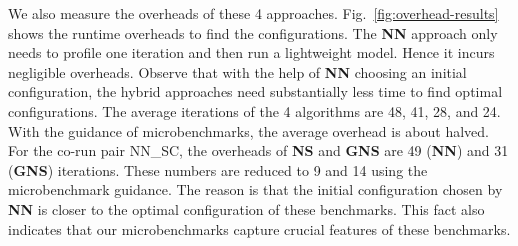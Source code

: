 We also measure the %
overheads of these 4 approaches. 
Fig.~\ref{fig:overhead-results} shows the runtime overheads to find the configurations. 
The \textbf{NN} approach only needs
to profile one iteration and then run a lightweight model. Hence it incurs negligible overheads. %
Observe that with the help of \textbf{NN} choosing an initial configuration, the hybrid approaches need substantially
less time to find optimal configurations. %
The average iterations of the 4 algorithms
are 48, 41, 28, and 24. %
With the guidance of microbenchmarks, the average overhead is about halved. %
For %
the co-run pair NN\_SC, the overheads of \textbf{NS} and \textbf{GNS} are 49 (\textbf{NN}) and  31 (\textbf{GNS}) iterations. %
These numbers are reduced to 9 and 14 using the microbenchmark guidance. %
The reason is that the initial configuration chosen by \textbf{NN} is closer to the optimal configuration of these benchmarks. This fact also indicates that our microbenchmarks capture crucial features of these benchmarks.
